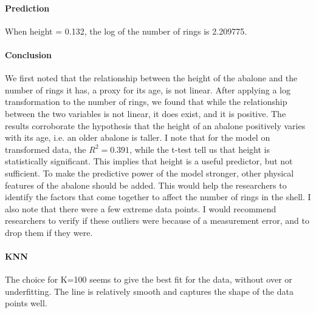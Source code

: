\documentclass[11pt,letterpaper]{article}
\begin{document}
  \paragraph*{Prediction}
  When height = 0.132, the log of the number of rings is 2.209775. 
  
  \paragraph*{Conclusion}
  We first noted that the relationship between the height of the abalone and the number of rings it has, a proxy for its age, is not linear. After applying a log transformation to the number of rings, we found that while the relationship between the two variables is not linear, it does exist, and it is positive. The results corroborate the hypothesis that the height of an abalone positively varies with its age, i.e. an older abalone is taller. I note that for the model on transformed data, the $R^2 = 0.391$, while the t-test tell us that height is statistically significant. This implies that height is a useful predictor, but not sufficient. To make the predictive power of the model stronger, other physical features of the abalone should be added. This would help the researchers to identify the factors that come together to affect the number of rings in the shell. I also note that there were a few extreme data points. I would recommend researchers to verify if these outliers were because of a measurement error, and to drop them if they were. 
  
  \paragraph*{KNN}
  The choice for K=100 seems to give the best fit for the data, without over or underfitting. The line is relatively smooth and captures the shape of the data points well. 
   
	
\end{document}
